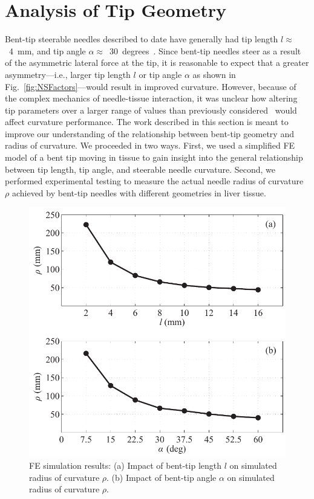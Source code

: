 \section{Analysis of Tip Geometry }
\label{sec:TipGeometryAnalysis}
Bent-tip steerable needles described to date have generally had tip length $l \approx$~4~mm, and tip angle $\alpha \approx$~30~degrees~\cite{Patil2014,Swaney2013,Rucker2013,Majewicz2012}. Since bent-tip needles steer as a result of the asymmetric lateral force at the tip, it is reasonable to expect that a greater asymmetry---i.e., larger tip length $l$ or tip angle $\alpha$ as shown in Fig.~\ref{fig:NSFactors}---would result in improved curvature. However, because of the complex mechanics of needle-tissue interaction, it was unclear how altering tip parameters over a larger range of values than previously considered~\cite{Majewicz2010} would affect curvature performance. The work described in this section is meant to improve our understanding of the relationship between bent-tip geometry and radius of curvature. We proceeded in two ways. First, we used a simplified FE model of a bent tip moving in tissue to gain insight into the general relationship between tip length, tip angle, and steerable needle curvature. Second, we performed experimental testing to measure the actual needle radius of curvature $\rho$ achieved by bent-tip needles with different geometries in liver tissue.

\begin{figure}[!t]
\centering
\includegraphics[width=0.75\columnwidth]{Images/Chapter3/AbaqusResults/AbaqusResults}%
\caption[FE simulation results]{FE simulation results: (a) Impact of bent-tip length $l$ on simulated radius of curvature $\rho$. (b) Impact of bent-tip angle $\alpha$ on simulated radius of curvature $\rho$.}
\label{fig:AbaqusResults}
\end{figure}

